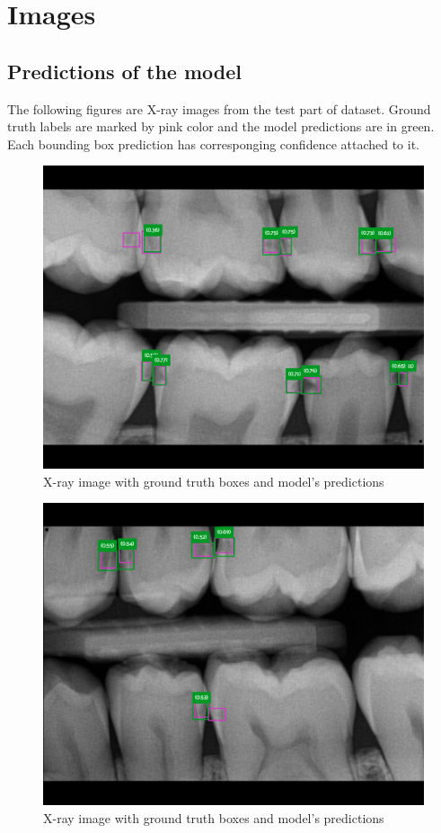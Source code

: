 \chapter{Images}
\label{appendix:model_predictions}
\section{Predictions of the model}
The following figures are X-ray images from the test part of dataset. Ground truth labels are marked by pink color and the model predictions are in green. Each bounding box prediction has corresponging confidence attached to it.
\begin{figure}[H]
    \includegraphics[width=0.9\linewidth]{images/no_rest1.png}
    \caption{X-ray image with ground truth boxes and model's predictions}
    \label{fig:pred_img1}
\end{figure}

\begin{figure}[H]
    \includegraphics[width=0.9\linewidth]{images/no_rest2.png}
    \caption{X-ray image with ground truth boxes and model's predictions}
    \label{fig:pred_img2}
\end{figure}

